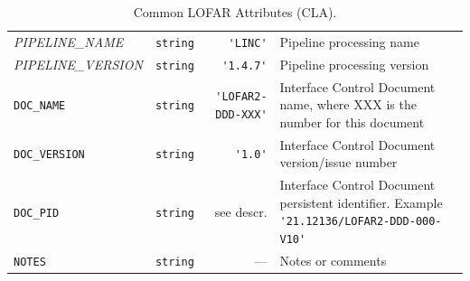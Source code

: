 \begin{table}[htbp]
\begin{tabular}{|lp{1.5cm}rp{5cm}|}
    \small{\textit{PIPELINE\_NAME}}  & \small\verb|string|  & \verb|'LINC'|  &  Pipeline processing name \\
    \small{\textit{PIPELINE\_VERSION}} & \small\verb|string|  & \verb|'1.4.7'|  &  Pipeline processing version \\
    \small \verb|DOC_NAME| & \small\verb|string|  & \verb|'LOFAR2-DDD-XXX'|  &  Interface Control Document name, where XXX is the number for this document \\
    \small \verb|DOC_VERSION| & \small\verb|string|  & \verb|'1.0'|  &  Interface Control Document version/issue number \\
     \small \verb|DOC_PID| & \small\verb|string|  & see descr.  &  Interface Control Document persistent identifier. Example  \verb|'21.12136/LOFAR2-DDD-000-V10'| \\
    \small \verb|NOTES| & \small\verb|string|  & ---  &  Notes or comments \\
   \hline
  \end{tabular}
  \caption{Common LOFAR Attributes (CLA).}
  \label{tab:lofar common metadata}
\end{table}
